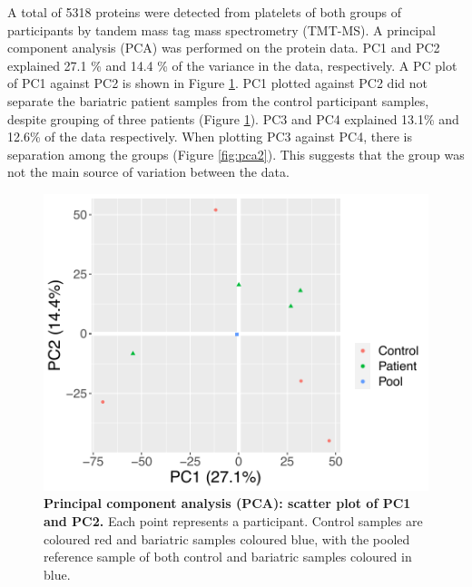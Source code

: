 \documentclass[11pt,twoside]{bristolthesis}
\begin{document}
A total of 5318 proteins were detected from platelets of both groups of participants by tandem mass tag mass spectrometry (TMT-MS). A principal component analysis (PCA) was performed on the protein data. PC1 and PC2 explained 27.1 \% and 14.4 \% of the variance in the data, respectively. A PC plot of PC1 against PC2 is shown in Figure \ref{fig:pca}. PC1 plotted against PC2 did not separate the bariatric patient samples from the control participant samples, despite grouping of three patients (Figure \ref{fig:pca}). PC3 and PC4 explained 13.1\% and 12.6\% of the data respectively. When plotting PC3 against PC4, there is separation among the groups (Figure \ref{fig:pca2}). This suggests that the group was not the main source of variation between the data.



\begin{figure}
\includegraphics[width=0.8\linewidth]{figure/Bariatric_study/Proteomic_PCA} \caption[Principal component analysis (PCA): scatter plot of PC1 and PC2]{\textbf{Principal component analysis (PCA): scatter plot of PC1 and PC2.} Each point represents a participant. Control samples are coloured red and bariatric samples coloured blue, with the pooled reference sample of both control and bariatric samples coloured in blue.}\label{fig:pca}
\end{figure}
\end{document}
